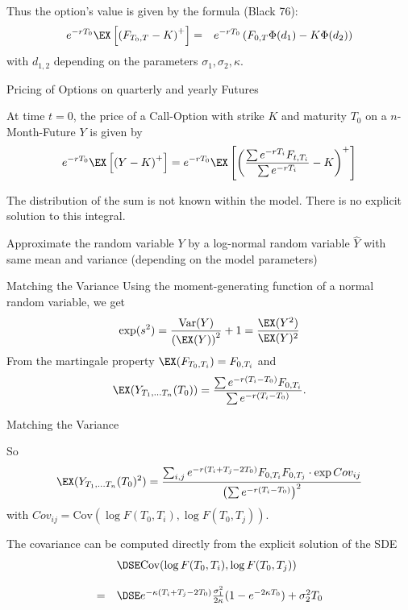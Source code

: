 	Thus the option's value is given by the formula (Black 76):
\begin{eqnarray*}
e^{-rT_0}\EX\left[\left(F_{T_0,T}-K\right)^+\right] & = &
e^{-rT_0}\left(F_{0,T}\Phi(d_1)-K\Phi(d_2)\right)
\end{eqnarray*}with $d_{1,2}$ depending on the parameters $\sigma_1, \sigma_2, \kappa$.





{Pricing of Options on quarterly and yearly Futures}






	At time $t=0$, the price of a  Call-Option with strike $K$ and maturity $T_0$ on a $n$-Month-Future
$Y$ is given by
$$
e^{-rT_0}\EX\left[\left(Y-K\right)^+\right]=e^{-rT_0}\EX
\left[\left(\frac{\sum e^{-rT_i}F_{t,T_i}}{\sum e^{-rT_i}}-K\right)^+\right]$$


	The distribution of the sum is not known within the model. There is no explicit solution to this integral.


	Approximate the random variable $Y$ by a log-normal random variable $\hat{Y}$
with same mean and variance (depending on the model parameters)





{Matching the Variance}
Using the moment-generating function of a normal random variable, we get
$$
\exp (s^2) = \frac{\textrm{Var}(Y)}{\left(\EX (Y)\right)^2} + 1  = \frac{\EX(Y^2)}{\EX(Y)^2}
$$
From the martingale property
$\EX (F_{T_0,T_i}) =  F_{0,T_i} $ and
$$ \EX (Y_{T_1, \ldots T_n}(T_0))  =
\frac{\sum e^{-r(T_i-T_0)} F_{0,T_i}}{\sum e^{-r(T_i-T_0)}}.$$

{Matching the Variance}

So
$$
\EX (Y_{T_1, \ldots T_n}(T_0)^2)
=  \frac{\sum_{i, j}e^{-r(T_i+T_j-2T_0)} F_{0,T_i}F_{0,T_j}\cdot \exp Cov_{ij}}{\left(\sum e^{-r(T_i-T_0)}\right)^2}
$$ with
$Cov_{ij} = \textrm{Cov}(\log F(T_0,T_i), \log F(T_0,T_j))$.

The covariance can be computed directly from the explicit solution of the SDE
$$\begin{array}{ll}
& \DSE \textrm{Cov}(\log F(T_0,T_i), \log F(T_0,T_j)) \\*[12pt]
 = & \DSE
 e^{-\kappa(T_i+T_j-2T_0)}\frac{\sigma_1^2}{2\kappa}(1-e^{-2\kappa T_0})+\sigma_2^2 T_0
\end{array}
$$

